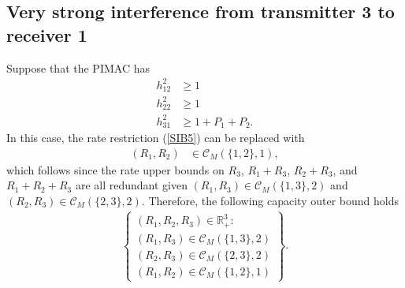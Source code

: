 \documentclass[10pt,conference]{IEEEtran}
\begin{document}
\subsection{Very strong interference from transmitter 3 to receiver 1}
Suppose that the PIMAC has
\begin{align}
\label{VSI31-1}
h_{12}^2&\geq1\\
h_{22}^2&\geq1\\
\label{VSI31-3}
h_{31}^2&\geq1+P_1+P_2.
\end{align}
In this case, the rate restriction (\ref{SIB5}) can be replaced with
\begin{align}
(R_1,R_2)&\in\mathcal{C}_M(\{1,2\},1),
\end{align}
which follows since the rate upper bounds on $R_3$, $R_1+R_3$, $R_2+R_3$, and $R_1+R_2+R_3$ are all redundant given $(R_1,R_3)\in\mathcal{C}_M(\{1,3\},2)$ and $(R_2,R_3)\in\mathcal{C}_M(\{2,3\},2)$. Therefore, the following capacity outer bound holds
\begin{align}
\left\{
\begin{array}{l}
(R_1,R_2,R_3)\in\mathbb{R}_+^3:\\
(R_1,R_3)\in\mathcal{C}_M(\{1,3\},2)\\
(R_2,R_3)\in\mathcal{C}_M(\{2,3\},2)\\
(R_1,R_2)\in\mathcal{C}_M(\{1,2\},1)
\end{array}\right\}.
\end{align} 
 
\end{document}
